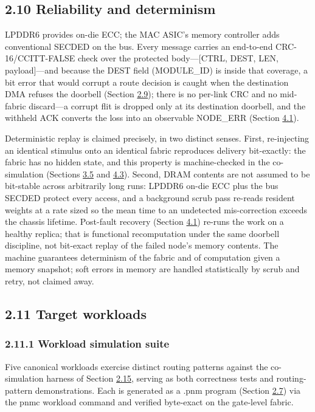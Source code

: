 \documentclass[12pt,onecolumn]{article}
\begin{document}
\subsection*{2.10 Reliability and determinism}\label{sec:2.10}

LPDDR6 provides on-die ECC; the MAC ASIC's memory controller adds conventional SECDED on the bus. Every message carries an end-to-end CRC-16/CCITT-FALSE check over the protected body---[CTRL, DEST, LEN, payload]---and because the DEST field (MODULE\_ID) is inside that coverage, a bit error that would corrupt a route decision is caught when the destination DMA refuses the doorbell (Section \hyperref[sec:2.9]{2.9}); there is no per-link CRC and no mid-fabric discard---a corrupt flit is dropped only at its destination doorbell, and the withheld ACK converts the loss into an observable NODE\_ERR (Section \hyperref[sec:4.1]{4.1}).

Deterministic replay is claimed precisely, in two distinct senses. First, re-injecting an identical stimulus onto an identical fabric reproduces delivery bit-exactly: the fabric has no hidden state, and this property is machine-checked in the co-simulation (Sections \hyperref[sec:3.5]{3.5} and \hyperref[sec:4.3]{4.3}). Second, DRAM contents are not assumed to be bit-stable across arbitrarily long runs: LPDDR6 on-die ECC plus the bus SECDED protect every access, and a background scrub pass re-reads resident weights at a rate sized so the mean time to an undetected mis-correction exceeds the chassis lifetime. Post-fault recovery (Section \hyperref[sec:4.1]{4.1}) re-runs the work on a healthy replica; that is functional recomputation under the same doorbell discipline, not bit-exact replay of the failed node's memory contents. The machine guarantees determinism of the fabric and of computation given a memory snapshot; soft errors in memory are handled statistically by scrub and retry, not claimed away.

\subsection*{2.11 Target workloads}\label{sec:2.11}

\subsubsection*{2.11.1 Workload simulation suite}\label{sec:2.11.1}

Five canonical workloads exercise distinct routing patterns against the co-simulation harness of Section \hyperref[sec:2.15]{2.15}, serving as both correctness tests and routing-pattern demonstrations. Each is generated as a .pnm program (Section \hyperref[sec:2.7]{2.7}) via the pnmc workload command and verified byte-exact on the gate-level fabric.
\end{document}
